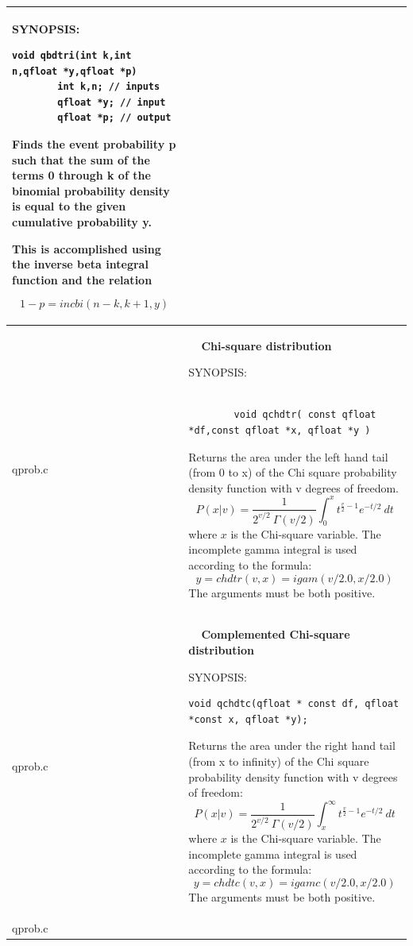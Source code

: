 \documentclass[10pt,a4paper,x11names]{memoir} %
\newcounter{entry}
\newcommand{\TOC}[1] {\addcontentsline{toc}{section}{\theentry\ \  #1} \textbf{\theentry\ \  #1} \par\stepcounter{entry}}
\begin{document}
\begin{longtable}{|p{1.5cm}|p{11.5cm}|}
	{\footnotesize SYNOPSIS:}\vspace{-0.2cm}\index{qbdtri}
	\begin{lstlisting}[numbers=none]
		void qbdtri(int k,int n,qfloat *y,qfloat *p)
		int k,n; // inputs
		qfloat *y; // input
		qfloat *p; // output
	\end{lstlisting}\vspace{-0.2cm}
	
	Finds the event probability p such that the sum of the  terms 0 through k of the binomial probability density is equal to the given cumulative probability y.
	
	This is accomplished using the inverse beta integral
	function and the relation
	
	$$ 1 - p = incbi( n-k, k+1, y )$$
	\\\hline
	qprob.c&	\TOC{Chi-square distribution}
	
	{\footnotesize SYNOPSIS:}\vspace{-0.2cm}\index{qchdtr}
	\begin{lstlisting}[numbers=none]
		
		void qchdtr( const qfloat *df,const qfloat *x, qfloat *y )
	\end{lstlisting}\vspace{-0.2cm}
	
	Returns the area under the left hand tail (from 0 to x)
	of the Chi square probability density function with
	v degrees of freedom.
	$$ P(x|v) = \frac{1}{2^{v/2}\ \Gamma (v/2)}\int_{0}^{x}t^{\frac{v}{2}-1}e^{-t/2}\ dt$$
	where $x$ is the Chi-square variable. The incomplete gamma integral is used according to the formula:
	$$y=chdtr(v,x)=igam(v/2.0,x/2.0)$$ The arguments must be both positive.
	\\\hline
	qprob.c&	\TOC{Complemented Chi-square distribution} 
	
	{\footnotesize SYNOPSIS:}\vspace{-0.2cm}\index{qchdtc}
	\begin{lstlisting}[numbers=none]
		void qchdtc(qfloat * const df, qfloat *const x, qfloat *y);
	\end{lstlisting}\vspace{-0.2cm}
	
	Returns the area under the right hand tail (from x to
	infinity) of the Chi square probability density function
	with v degrees of freedom:
	$$ P(x|v) = \frac{1}{2^{v/2}\ \Gamma (v/2)}\int_{x}^{\infty}t^{\frac{v}{2}-1}e^{-t/2}\ dt$$
	where $x$ is the Chi-square variable. The incomplete gamma integral is used according to the formula:
	$$y=chdtc(v,x)=igamc(v/2.0,x/2.0)$$ The arguments must be both positive.
	\\\hline
	qprob.c&
	

\end{longtable}
\end{document}
